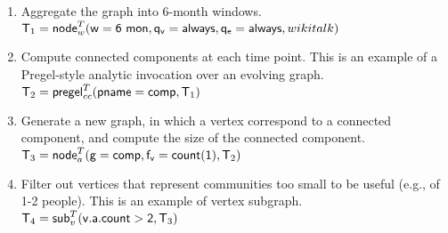 \begin{enumerate}[noitemsep,itemindent=\dimexpr\labelwidth+\labelsep\relax,leftmargin=0pt]
\item Aggregate the graph into 6-month windows.\\
$\mathsf{T}_1 = \textsf{node}^T_w(\mathsf{w=6~mon},\mathsf{q_v=always},\mathsf{q_e=always},wikitalk)$

\item Compute connected components at each time point.  This is an
  example of a Pregel-style analytic invocation over an evolving
  graph. $\mathsf{T}_2 = \textsf{pregel}^T_{cc} (\mathsf{pname=comp}, \mathsf{T}_1)$



\item Generate a new graph, in which a vertex correspond to a
  connected component, and compute the size of the connected
  component. $\mathsf{T}_3 =
  \textsf{node}^T_a(\mathsf{g=comp,f_v=count(1)},\mathsf{T}_2)$


\item Filter out vertices that represent communities too small to be
  useful (e.g., of 1-2 people).  This is an example of vertex
  subgraph.  $\mathsf{T}_4 = \textsf{sub}^T_v(\mathsf{v.a.count > 2},\mathsf{T}_3)$

\end{enumerate}

